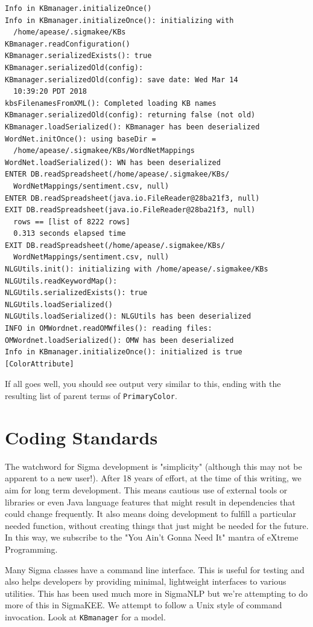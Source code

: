 \documentclass{book}
\begin{document}
\begin{lstlisting}[basicstyle=\ttfamily\small\bfseries]
Info in KBmanager.initializeOnce()
Info in KBmanager.initializeOnce(): initializing with 
  /home/apease/.sigmakee/KBs
KBmanager.readConfiguration()
KBmanager.serializedExists(): true
KBmanager.serializedOld(config): 
KBmanager.serializedOld(config): save date: Wed Mar 14 
  10:39:20 PDT 2018
kbsFilenamesFromXML(): Completed loading KB names
KBmanager.serializedOld(config): returning false (not old)
KBmanager.loadSerialized(): KBmanager has been deserialized 
WordNet.initOnce(): using baseDir = 
  /home/apease/.sigmakee/KBs/WordNetMappings
WordNet.loadSerialized(): WN has been deserialized 
ENTER DB.readSpreadsheet(/home/apease/.sigmakee/KBs/
  WordNetMappings/sentiment.csv, null)
ENTER DB.readSpreadsheet(java.io.FileReader@28ba21f3, null)
EXIT DB.readSpreadsheet(java.io.FileReader@28ba21f3, null)
  rows == [list of 8222 rows]
  0.313 seconds elapsed time
EXIT DB.readSpreadsheet(/home/apease/.sigmakee/KBs/
  WordNetMappings/sentiment.csv, null)
NLGUtils.init(): initializing with /home/apease/.sigmakee/KBs
NLGUtils.readKeywordMap():
NLGUtils.serializedExists(): true
NLGUtils.loadSerialized()
NLGUtils.loadSerialized(): NLGUtils has been deserialized 
INFO in OMWordnet.readOMWfiles(): reading files: 
OMWordnet.loadSerialized(): OMW has been deserialized 
Info in KBmanager.initializeOnce(): initialized is true
[ColorAttribute]
\end{lstlisting}

If all goes well, you should see output very similar to this, ending with the resulting
list of parent terms of \texttt{PrimaryColor}.

\section{Coding Standards}

The watchword for Sigma development is "simplicity" (although this may not be
apparent to a new user!). After 18 years of effort, at the time of this writing,
we aim for long term development.  This means cautious use of external tools or
libraries or even Java language features that might result in dependencies that
could change frequently.  It also means doing development to fulfill a particular
needed function, without creating things that just might be needed for the future.
In this way, we subscribe to the "You Ain't Gonna Need It" mantra of eXtreme
Programming.

Many Sigma classes have a command line interface.  This is useful for testing and
also helps developers by providing minimal, lightweight interfaces to various
utilities.  This has been used much more in SigmaNLP but we're attempting to do
more of this in SigmaKEE.  We attempt to follow a Unix style of command invocation.
Look at \texttt{KBmanager} for a model.
\end{document}
